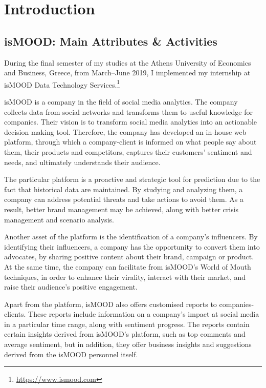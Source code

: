 \section{Introduction}
\label{sec:introduction}

\subsection{isMOOD: Main Attributes \& Activities}
\label{subsec:ismood}

During the final semester of my studies
at the Athens University of Economics and Business, Greece,
from March--June 2019,
I implemented my internship
at isMOOD Data Technology Services.\footnote{\url {https://www.ismood.com}}

isMOOD is a company in the field of social media analytics.
The company collects data from social networks
and transforms them to useful knowledge for companies.
Their vision is to transform social media analytics
into an actionable decision making tool.
Therefore, the company has developed an in-house web platform,
through which a company-client is informed
on what people say about them, their products and competitors,
captures their customers' sentiment and needs,
and ultimately understands their audience.

The particular platform is a proactive and strategic tool for prediction
due to the fact that historical data are maintained.
By studying and analyzing them,
a company can address potential threats
and take actions to avoid them.
As a result, better brand management may be achieved,
along with better crisis management and scenario analysis.

Another asset of the platform is the identification
of a company's influencers.
By identifying their influencers,
a company has the opportunity
to convert them into advocates,
by sharing positive content about their brand, campaign or product.
At the same time, the company can facilitate 
from isMOOD's World of Mouth techniques,
in order to enhance their virality,
interact with their market,
and raise their audience's positive engagement.

Apart from the platform,
isMOOD also offers customised reports to companies-clients.
These reports include information on a company's impact
at social media in a particular time range,
along with sentiment progress.
The reports contain certain insights
derived from isMOOD's platform,
such as top comments and average sentiment,
but in addition,
they offer business insights and suggestions
derived from the isMOOD personnel itself.

